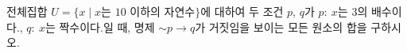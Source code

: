 전체집합 $U=\{x \mid x$는 $10$ 이하의 자연수$\}$에 대하여 두 조건 $p$, $q$가 $p:\ x$는 $3$의 배수이다., $q:\ x$는 짝수이다.일 때, 명제 $\sim p\longrightarrow q$가 거짓임을 보이는 모든 원소의 합을 구하시오.
